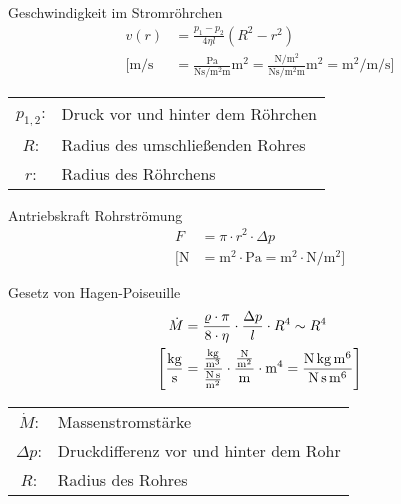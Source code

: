 \begin{karte}{Geschwindigkeit im Stromröhrchen}
    \begin{align*}
        v(r) &= \frac{p_1-p_2}{4\eta l}(R^2-r^2) \\
        \Bigg[ \si{\meter\per\second} &= \frac{\si{\pascal}}{\si{\newton\second\per\square\meter}\si{\meter}} \si{\square\meter} = 
             \frac{\si{\newton\per\square\meter}}{\si{\newton\second\per\square\meter}\si{\meter}} \si{\square\meter} =
             \si{\square\meter\per\meter\per\second}
            \Bigg] 
    \end{align*}
     \begin{tabular}[t]{cl}
         \(p_{1,2}\): &Druck vor und hinter dem Röhrchen \\
         \(R\): &Radius des umschließenden Rohres \\
         \(r\): &Radius des Röhrchens
     \end{tabular}
\end{karte}

\begin{karte}{Antriebskraft Rohrströmung}
    \begin{align*}
        F &= \pi \cdot r^2 \cdot  \Delta p \\
        \bigg[ \si{\newton} &= \si{\square\meter} \cdot \si{\pascal} = \si{\square\meter} \cdot \si{\newton\per\square\meter} \bigg]
    \end{align*}
\end{karte}

\begin{karte}{Gesetz von Hagen-Poiseuille}
    \begin{align*}
        \dot M &= \frac{\varrho\cdot\pi}{8\cdot\eta} \cdot \frac{ \Delta p}{l} \cdot R^4 \sim R^4 \\
        \Bigg[ \si{\kilogram\per\second} &= 
            \frac{\si{\kilogram\per\cubic\meter}}{\si{\newton\second\per\square\meter}} \cdot \frac{\si{\newton\per\square\meter}}{\si{\meter}} \cdot \si{\raiseto{4}\meter} = \si[sticky-per=true]{\newton\kilogram\raiseto{6}\meter \per \newton\second\raiseto{6}\meter}
            \Bigg]
    \end{align*}
     \begin{tabular}[t]{cl}
         \(\dot M\): &Massenstromstärke \\
         \(\Delta p\): &Druckdifferenz vor und hinter dem Rohr \\
         \(R\): &Radius des Rohres 
     \end{tabular}
\end{karte}

